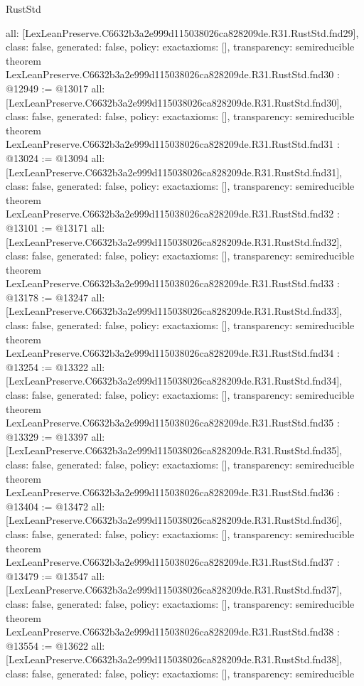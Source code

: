 \begin{lexlean}{RustStd}
\begin{coremodule}
{  all: [LexLeanPreserve.C6632b3a2e999d115038026ca828209de.R31.RustStd.fnd29],
  class: false,
  generated: false,
  policy: exact{axioms: []},
  transparency: semireducible
}
theorem LexLeanPreserve.C6632b3a2e999d115038026ca828209de.R31.RustStd.fnd30 : @12949 := @13017 {
  all: [LexLeanPreserve.C6632b3a2e999d115038026ca828209de.R31.RustStd.fnd30],
  class: false,
  generated: false,
  policy: exact{axioms: []},
  transparency: semireducible
}
theorem LexLeanPreserve.C6632b3a2e999d115038026ca828209de.R31.RustStd.fnd31 : @13024 := @13094 {
  all: [LexLeanPreserve.C6632b3a2e999d115038026ca828209de.R31.RustStd.fnd31],
  class: false,
  generated: false,
  policy: exact{axioms: []},
  transparency: semireducible
}
theorem LexLeanPreserve.C6632b3a2e999d115038026ca828209de.R31.RustStd.fnd32 : @13101 := @13171 {
  all: [LexLeanPreserve.C6632b3a2e999d115038026ca828209de.R31.RustStd.fnd32],
  class: false,
  generated: false,
  policy: exact{axioms: []},
  transparency: semireducible
}
theorem LexLeanPreserve.C6632b3a2e999d115038026ca828209de.R31.RustStd.fnd33 : @13178 := @13247 {
  all: [LexLeanPreserve.C6632b3a2e999d115038026ca828209de.R31.RustStd.fnd33],
  class: false,
  generated: false,
  policy: exact{axioms: []},
  transparency: semireducible
}
theorem LexLeanPreserve.C6632b3a2e999d115038026ca828209de.R31.RustStd.fnd34 : @13254 := @13322 {
  all: [LexLeanPreserve.C6632b3a2e999d115038026ca828209de.R31.RustStd.fnd34],
  class: false,
  generated: false,
  policy: exact{axioms: []},
  transparency: semireducible
}
theorem LexLeanPreserve.C6632b3a2e999d115038026ca828209de.R31.RustStd.fnd35 : @13329 := @13397 {
  all: [LexLeanPreserve.C6632b3a2e999d115038026ca828209de.R31.RustStd.fnd35],
  class: false,
  generated: false,
  policy: exact{axioms: []},
  transparency: semireducible
}
theorem LexLeanPreserve.C6632b3a2e999d115038026ca828209de.R31.RustStd.fnd36 : @13404 := @13472 {
  all: [LexLeanPreserve.C6632b3a2e999d115038026ca828209de.R31.RustStd.fnd36],
  class: false,
  generated: false,
  policy: exact{axioms: []},
  transparency: semireducible
}
theorem LexLeanPreserve.C6632b3a2e999d115038026ca828209de.R31.RustStd.fnd37 : @13479 := @13547 {
  all: [LexLeanPreserve.C6632b3a2e999d115038026ca828209de.R31.RustStd.fnd37],
  class: false,
  generated: false,
  policy: exact{axioms: []},
  transparency: semireducible
}
theorem LexLeanPreserve.C6632b3a2e999d115038026ca828209de.R31.RustStd.fnd38 : @13554 := @13622 {
  all: [LexLeanPreserve.C6632b3a2e999d115038026ca828209de.R31.RustStd.fnd38],
  class: false,
  generated: false,
  policy: exact{axioms: []},
  transparency: semireducible
}
\end{coremodule}
\end{lexlean}
